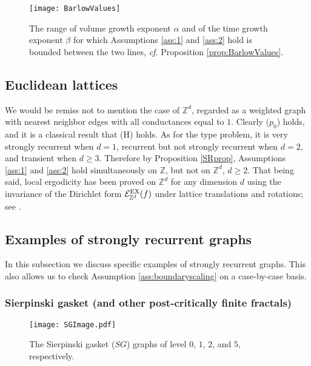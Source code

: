 \documentclass[11pt]{amsart}
\theoremstyle{plain}
\theoremstyle{definition}
\theoremstyle{remark}
\begin{document}
\begin{figure}
\centering
\texttt{[image: BarlowValues]}
\caption{The range of volume growth exponent $\alpha$ and of the time growth exponent $\beta$ for which Assumptions \ref{ass:1} and \ref{ass:2} hold is bounded between the two lines, \emph{cf.\@} Proposition \ref{prop:BarlowValues}.}
\label{fig:BarlowValues}
\end{figure}

\subsection{Euclidean lattices}

We would be remiss not to mention the case of $\mathbb{Z}^d$, regarded as a weighted graph with nearest neighbor edges with all conductances equal to $1$. Clearly ($p_0$) holds, and it is a classical result that (H) holds. As for the type problem, it is very strongly recurrent when $d=1$, recurrent but not strongly recurrent when $d=2$, and transient when $d\geq 3$. Therefore by Proposition \ref{SRprop}, Assumptions \ref{ass:1} and \ref{ass:2} hold simultaneously on $\mathbb{Z}$, but not on $\mathbb{Z}^d$, $d\geq 2$. That being said, local ergodicity has been proved on $\mathbb{Z}^d$ for any dimension $d$ using the invariance of the Dirichlet form $\mathcal{E}^{\rm EX}_{\mathbb{Z}^d}(f)$ under lattice translations and rotations; see \cites{GPV88, KOV89,KipnisLandim}.

\subsection{Examples of strongly recurrent graphs}

In this subsection we discuss specific examples of strongly recurrent graphs.
This also allows us to check Assumption \ref{ass:boundaryscaling} on a case-by-case basis. 

\subsubsection{Sierpinski gasket (and other post-critically finite fractals)}

\begin{figure}
\centering
\texttt{[image: SGImage.pdf]}
\caption{The Sierpinski gasket ($SG$) graphs of level $0$, $1$, $2$, and $5$, respectively.}
\label{fig:SGImage}
\end{figure}
\end{document}
